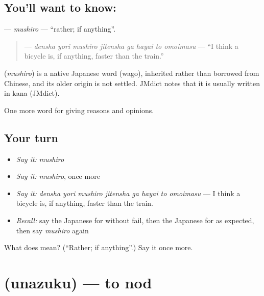 \subsection*{You'll want to know: }
\textbf{} — \emph{mushiro} — \textquotedblleft{}rather; if anything\textquotedblright{}.

\begin{quote}
\textbf{    } — \emph{densha yori mushiro jitensha ga hayai to omoimasu} — \textquotedblleft{}I think a bicycle is, if anything, faster than the train.\textquotedblright{}
\end{quote}

\begin{cousinweb}
\textbf{} (\emph{mushiro}) is a native Japanese word (wago), inherited rather than borrowed from Chinese, and its older origin is not settled. JMdict notes that it is usually written in kana (JMdict).
\end{cousinweb}

\begin{grammarlens}[title={What you've built}]
One more word for giving reasons and opinions.
\end{grammarlens}

\subsection*{Your turn}
\begin{itemize}
\raggedright
  \item \emph{Say it:} \emph{mushiro}
  \item \emph{Say it:} \emph{mushiro}, once more
  \item \emph{Say it:} \emph{densha yori mushiro jitensha ga hayai to omoimasu} — I think a bicycle is, if anything, faster than the train.
  \item \emph{Recall:} say the Japanese for without fail, then the Japanese for as expected, then say \emph{mushiro} again
\end{itemize}

\begin{tcolorbox}[breakable,colback=teal!4,colframe=teal!35!black,title={Before you move on}]
What does  mean? (\textquotedblleft{}Rather; if anything\textquotedblright{}.) Say it once more.
\end{tcolorbox}
\section[\texorpdfstring{\ja{うなずく} (unazuku)}{うなずく (unazuku)}]{ (unazuku) — to nod}

